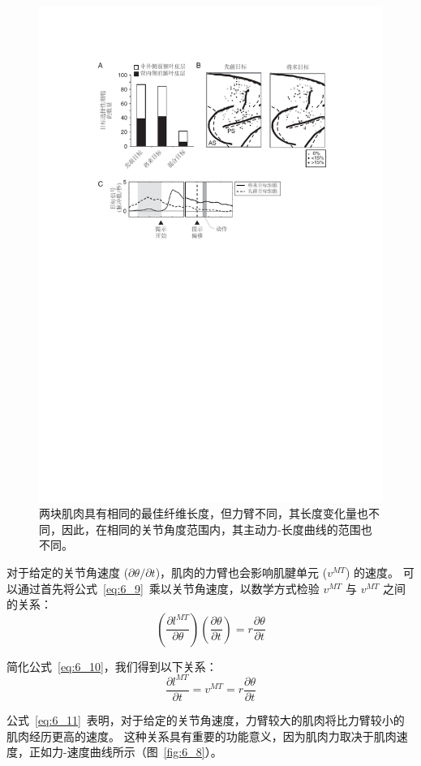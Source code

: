 \begin{figure}[!htb]
	\centering
	\includegraphics[width=0.7\linewidth]{chap6/6_7}
	\caption{两块肌肉具有相同的最佳纤维长度，但力臂不同，其长度变化量也不同，因此，在相同的关节角度范围内，其主动力-长度曲线的范围也不同。 \label{fig:6_7}}
\end{figure}


对于给定的关节角速度 ($\partial \theta / \partial t$)，肌肉的力臂也会影响肌腱单元 ($v^{MT}$) 的速度。
可以通过首先将公式~\ref{eq:6_9}~乘以关节角速度，以数学方式检验 $v^{MT}$ 与 $v^{MT}$ 之间的关系：
%
\begin{equation}
	(
		\frac{\partial l^{MT}}{\partial \theta}
	)
	(
		\frac{\partial \theta}{\partial t}
	)
	=
	r \frac{\partial \theta}{\partial t}
	\label{eq:6_10}
\end{equation}


简化公式~\ref{eq:6_10}，我们得到以下关系：
%
\begin{equation}
	\frac{\partial l^{MT}}{\partial t}
	=
	v^{MT}
	=
	r \frac{\partial \theta}{\partial t}
	\label{eq:6_11}
\end{equation}


公式~\ref{eq:6_11}~表明，对于给定的关节角速度，力臂较大的肌肉将比力臂较小的肌肉经历更高的速度。
这种关系具有重要的功能意义，因为肌肉力取决于肌肉速度，正如力-速度曲线所示（图~\ref{fig:6_8}）。


